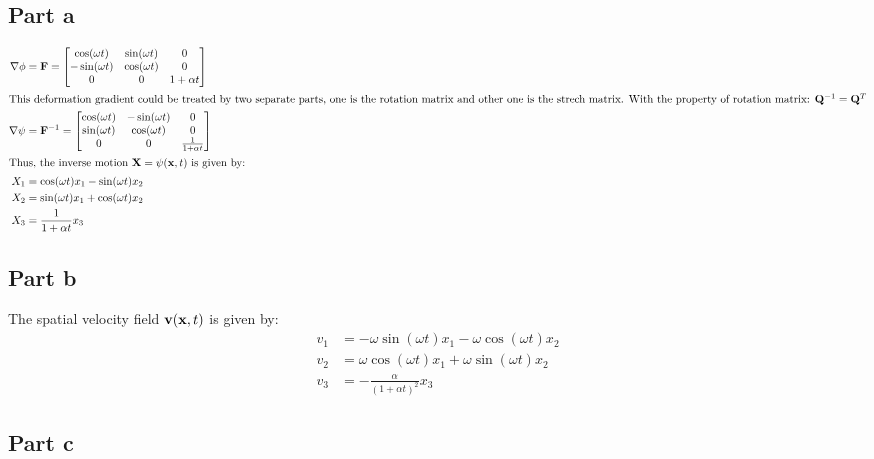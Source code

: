 \documentclass[a4paper,12pt]{article} %
\begin{document}
\subsection{Part a}
\begin{align*}
\nabla\phi & =\mathbf{F} = 
\begin{bmatrix} \cos(\omega t) & \sin(\omega t) & 0 \\
               -\sin(\omega t) & \cos(\omega t) & 0 \\
                0            & 0            & 1+\alpha t \end{bmatrix}\\
\intertext{This deformation gradient could be treated by two separate parts, one is the rotation matrix and other one is the strech matrix. With the property of rotation matrix: ${\mathbf{Q}}^{-1} ={\mathbf{Q}}^{T}$}
\nabla \psi &= {\mathbf{F}}^{-1} = \begin{bmatrix} \cos(\omega t) & -\sin(\omega t) & 0 \\
    \sin(\omega t) & \cos(\omega t) & 0 \\
     0            & 0            & \frac{1}{1+\alpha t} \end{bmatrix}\\
\intertext{Thus, the inverse motion $\mathbf{X}=\psi(\mathbf{x},t)$ is given by:}
 X_1 &= \cos(\omega t)x_1 - \sin(\omega t)x_2\\
 X_2 &= \sin(\omega t)x_1 + \cos(\omega t)x_2\\
 X_3 &= \frac{1}{1+\alpha t} x_3
\end{align*}

\subsection{Part b}
The spatial velocity field $\mathbf{v}(\mathbf{x},t)$ is given by:
\begin{align*}
v_1 &= -\omega \sin(\omega t)x_1 - \omega \cos(\omega t)x_2\\
v_2 &= \omega\cos(\omega t)x_1 + \omega\sin(\omega t)x_2\\
v_3 &= -\frac{\alpha}{{(1+\alpha t)}^2}x_3
\end{align*}

\subsection{Part c}

\newpage
\end{document}
